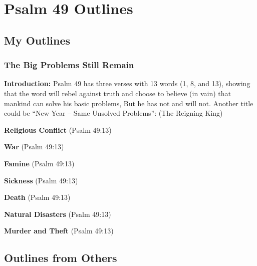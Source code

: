 \section{Psalm 49 Outlines}

\subsection{My Outlines}

\subsubsection{The Big Problems Still Remain}
\textbf{Introduction:} Psalm 49 has three verses with 13 words (1, 8, and 13), showing that the word will rebel against truth and choose to believe (in vain) that mankind can solve his basic problems, But he has not and will not. Another title could be ``New Year -- Same Unsolved Problems'':
 (The Reigning King)
\begin{compactenum}[I.][8]
    \item \textbf{Religious Conflict}  (Psalm 49:13)
    \item \textbf{War}  (Psalm 49:13)
    \item \textbf{Famine}  (Psalm 49:13)
    \item \textbf{Sickness}  (Psalm 49:13)
    \item \textbf{Death}  (Psalm 49:13)
    \item \textbf{Natural Disasters}  (Psalm 49:13)
    \item \textbf{Murder and Theft}  (Psalm 49:13)
\end{compactenum}



\subsection{Outlines from Others}
